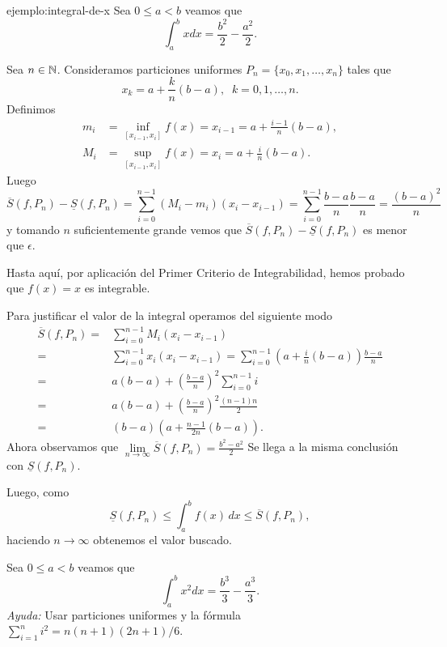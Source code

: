 \begin{ejemplo}{ejemplo:integral-de-x} Sea $0\leq a<b$ veamos que 
\[
 \int_a^b x dx=\frac{b^2}{2}-\frac{a^2}{2}.
\]
\begin{demo}
Sea $n \in \mathbb{N}$.
Consideramos particiones uniformes $P_n=\{x_0,x_1,\ldots,x_n\}$ tales que
\[x_k=a+\frac{k}{n}(b-a),\;\;  k=0,1,\ldots,n.\]
Definimos
\[\begin{split}
m_i&=\inf\limits_{[x_{i-1},x_i]}f(x)=x_{i-1}=a+\frac{i-1}{n}(b-a),
\\
M_i&=\sup\limits_{[x_{i-1},x_i]}f(x)=x_{i}=a+\frac{i}{n}(b-a).
\end{split}\]
Luego
\[
\overline{S}(f,P_n)-\underline{S}(f,P_n)=
\sum\limits_{i=0}^{n-1} (M_i-m_i)(x_i-x_{i-1})=
\sum\limits_{i=0}^{n-1}  
\frac{b-a}{n}\frac{b-a}{n}=\frac{(b-a)^2}{n}
\]
y tomando $n$ suficientemente grande vemos que $\overline{S}(f,P_n)-\underline{S}(f,P_n)$ es menor que $\epsilon$.

Hasta aqu\'i, por aplicaci\'on del Primer Criterio de Integrabilidad,  hemos probado que $f(x)=x$ es integrable. 

Para justificar el valor de la integral operamos del siguiente modo
\[
\begin{split}
\overline{S}(f,P_n)=&
\sum\limits_{i=0}^{n-1} M_i(x_i-x_{i-1})
\\
=&\sum\limits_{i=0}^{n-1} x_i(x_i-x_{i-1})=\sum\limits_{i=0}^{n-1}
\left(a+\frac{i}{n}(b-a) \right)\frac{b-a}{n}
\\
=&a(b-a)+\left(\frac{b-a}{n} \right)^2\sum\limits_{i=0}^{n-1} i
\\
=& a(b-a)+\left(\frac{b-a}{n} \right)^2 \frac{(n-1)n}{2}
\\
=&(b-a)\left(a+\frac{n-1}{2n} (b-a)\right).
\end{split}
\]
Ahora observamos que 
$\lim\limits_{n \to \infty} \overline{S}(f,P_n)=\frac{b^2-a^2}{2}$
Se llega a la misma conclusi\'on con $\underline{S}(f,P_n)$.

Luego, como 
\[
\underline{S}(f,P_n)\leq \int_a^b f(x)\,dx \leq \overline{S}(f,P_n),
\]
haciendo $n \to \infty$ obtenemos el valor buscado.
\end{demo}



\end{ejemplo}


\begin{ejercicio}{} Sea $0\leq a<b$ veamos que 
\[
 \int_a^b x^2 dx=\frac{b^3}{3}-\frac{a^3}{3}.
\]
{\em Ayuda:} Usar particiones uniformes y la fórmula $\sum_{i=1}^n i^2= n(n+1)(2n+1)/6$.
\end{ejercicio}

